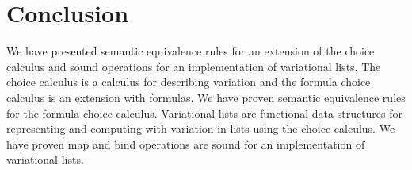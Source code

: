 \chapter{Conclusion}
\label{ch:conc}

We have presented semantic equivalence rules for an extension of the choice calculus and sound operations for an implementation of variational lists.
The choice calculus is a calculus for describing variation and the formula choice calculus is an extension with formulas.
We have proven semantic equivalence rules for the formula choice calculus.
Variational lists are functional data structures for representing and computing with variation in lists using the choice calculus.
We have proven map and bind operations are sound for an implementation of variational lists.
